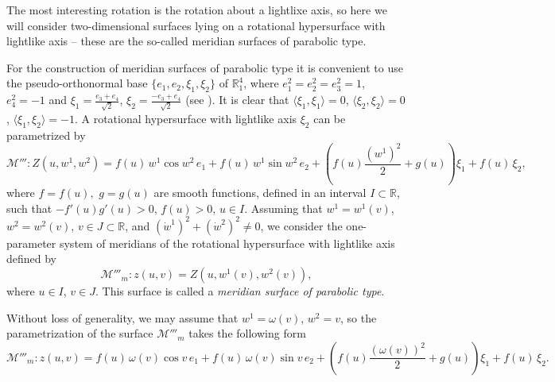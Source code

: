 \documentclass[12pt]{amsart}
\newcommand{\R}{\mathbb R}
\theoremstyle{definition}
\theoremstyle{remark}
\newcommand{\ds}{\displaystyle}
\numberwithin{equation}{section}
\begin{document}
The most interesting rotation is the rotation about a lightlixe axis, so here we will consider two-dimensional surfaces lying on a rotational hypersurface with lightlike axis -- these are  the so-called meridian surfaces of  parabolic type.

\vskip 2mm
For the construction of meridian surfaces of parabolic type it is convenient to use the  pseudo-orthonormal base
 $\{e_1,e_2, \xi_1, \xi_2 \}$  of $\R^4_1$, where $e_1^2 = e_2^2 = e_3^2 = 1$, $e_4^2 = -1$ and 
$ \ds{\xi_1= 	\frac{e_3 + e_4}{\sqrt{2}}}$, $\ds{\xi_2= \frac{ - e_3 + 		e_4}{\sqrt{2}}}$ (see \cite{G-M-IJGMMP-2013}). It is clear that $\langle\xi_1, \xi_1 \rangle =0$, $\langle
\xi_2, \xi_2 \rangle =0$, $\langle \xi_1, \xi_2
\rangle = -1$. A rotational hypersurface with lightlike axis  $\xi_2$ can
be parametrized by
$$\mathcal{M}''': Z(u,w^1,w^2) =  f(u)\, w^1 \cos w^2 \,e_1 +  f(u)\, w^1 \sin w^2 \,e_2+ \left(f(u) \frac{(w^1)^2}{2} + g(u)\right) \xi_1 + f(u) \,\xi_2,$$
where $f = f(u), \,\, g = g(u)$ are smooth functions, defined in an interval $I \subset \R$, such that $- f'(u)g'(u) >0$, $f(u)>0$,
$ u \in I$. Assuming that $w^1 = w^1(v)$, $w^2=w^2(v)$, $v \in J \subset \R$,
and $(\dot{w}^1)^2 + (\dot{w}^2)^2 \neq 0$, we consider the one-parameter system of meridians
of the rotational hypersurface  with lightlike
axis defined by
\begin{equation*} %
	\mathcal{M}'''_m: z(u,v) = Z(u,w^1(v),w^2(v)),
\end{equation*}
where $u \in I$, $v \in J$. This surface is called a \textit{meridian surface 	of parabolic type}. 

Without loss of generality, we may assume that $w^1 = \omega(v)$, $
w^2=v$, so the parametrization of the  surface $\mathcal{M}'''_m$ takes the following form 
\begin{equation*} %
	\mathcal{M}'''_m: z(u,v) = f(u)\, \omega(v) \cos v \,e_1 + f(u)\,
	\omega(v) \sin v \,e_2+ \left(f(u) \frac{(\omega(v))^2}{2} +
	g(u)\right)\xi_1 + f(u) \,\xi_2.
\end{equation*}
\end{document}
